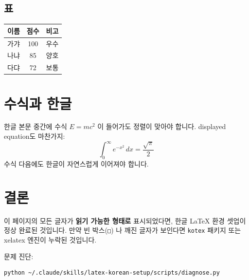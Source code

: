 \documentclass[11pt]{article}
\begin{document}
\subsection{표}
\begin{tabular}{|l|c|r|}
\hline
이름 & 점수 & 비고 \\
\hline
가갸 & 100 & 우수 \\
나냐 & 85  & 양호 \\
다댜 & 72  & 보통 \\
\hline
\end{tabular}

\section{수식과 한글}
한글 본문 중간에 수식 $E = mc^2$ 이 들어가도 정렬이 맞아야 합니다.
displayed equation도 마찬가지:
\[
  \int_0^\infty e^{-x^2}\,dx = \frac{\sqrt{\pi}}{2}
\]
수식 다음에도 한글이 자연스럽게 이어져야 합니다.

\section{결론}
이 페이지의 모든 글자가 \textbf{읽기 가능한 형태로} 표시되었다면, 한글 LaTeX
환경 셋업이 정상 완료된 것입니다. 만약 빈 박스(\texttt{□}) 나 깨진 글자가
보인다면 \texttt{kotex} 패키지 또는 xelatex 엔진이 누락된 것입니다.

문제 진단:
\begin{verbatim}
python ~/.claude/skills/latex-korean-setup/scripts/diagnose.py
\end{verbatim}
\end{document}
